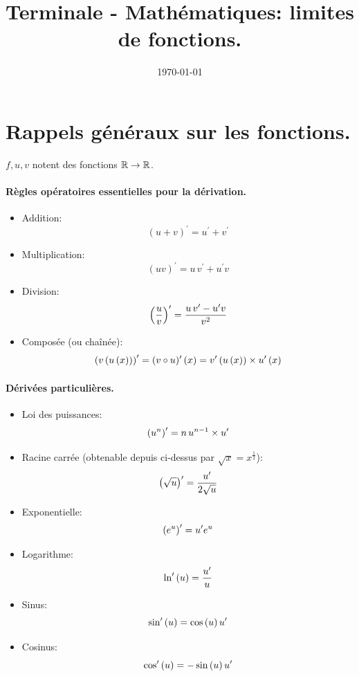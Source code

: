 \documentclass[12pt]{article}
\title{Terminale - Mathématiques: limites de fonctions.}
\author{\AuthorName}
\date{\today{}}
\begin{document}
\maketitle

\section{Rappels généraux sur les fonctions.}
$f, u, v$ notent des fonctions $\mathbb{R} \to \mathbb{R}$.

\paragraph{Règles opératoires essentielles pour la dérivation.}
\begin{itemize}
  \item Addition:
    $$(u + v)^{\prime} = u^{\prime} + v^{\prime}$$
  \item Multiplication:
    $$(uv)^{\prime} = u\,v^{\prime} + u^{\prime}v$$
  \item Division:
    $$ \left(\frac{u}{v}\right)^{\prime} = \frac{u\,v^{\prime} - u^{\prime}v}{v^2}$$
  \item Composée (ou chaînée): $$
      \left(v\left(u\left(x\right)\right)\right)^{\prime} 
    = (v \circ u)^{\prime}\left(x\right) 
    = v^{\prime}\left(u\left(x\right)\right) \times u^{\prime}\left(x\right)
    $$
\end{itemize}

\paragraph{Dérivées particulières.}
\begin{itemize}
  \item Loi des puissances: 
    $$\left(u^n\right)^{\prime} = n\,u^{n-1} \times u^{\prime}$$
  \item Racine carrée (obtenable depuis ci-dessus par $\sqrt{x} = x^{\frac{1}{2}}$): 
    $$\left(\sqrt{u}\right)^{\prime} = \frac{u^{\prime}}{2\sqrt{u}}$$
  \item Exponentielle:
    $$\left(e^{u}\right)^{\prime} = u^{\prime} e^{u}$$
  \item Logarithme:
    $$\ln^{\prime} \left(u\right) = \frac{u^{\prime}}{u}$$
  \item Sinus:
    $$\sin^{\prime}\left(u\right) = \cos\left(u\right) u^{\prime}$$
  \item Cosinus:
    $$\cos^{\prime}\left(u\right) = -\sin\left(u\right) u^{\prime}$$ 

\end{itemize}
\end{document}
